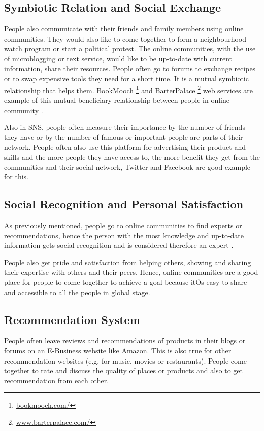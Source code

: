 \subsection{Symbiotic Relation and Social Exchange}

People also communicate with their friends and family members using online communities. They would also like to come together to form a neighbourhood watch program or start a political protest. The online communities, with the use of microblogging or text service, would like to be up-to-date with current information, share their resources. People often go to forums to exchange recipes or to swap expensive tools they need for a short time. It is a mutual symbiotic relationship that helps them. BookMooch \footnote{\url{bookmooch.com/}} and BarterPalace \footnote{\url{www.barterpalace.com/}} web services are example of this mutual beneficiary relationship between people in online community \cite{ridings2004virtual}.

Also in SNS, people often measure their importance by the number of friends they have or by the number of famous or important people are parts of their network. People often also use this platform for advertising their product and skills and the more people they have access to, the more benefit they get from the communities and their social network, Twitter and Facebook are good example for this.

\subsection{Social Recognition and Personal Satisfaction}

As previously mentioned, people go to online communities to find experts or recommendations, hence the person with the most knowledge and up-to-date information gets social recognition and is considered therefore an expert \cite{garton1997studying}.

People also get pride and satisfaction from helping others, showing and sharing their expertise with others and their peers. Hence, online communities are a good  place for people to come together to achieve a goal because itÕs easy to share and accessible to all the people in global stage.


\subsection{Recommendation System}

People often leave reviews and recommendations of products in their blogs or forums on an E-Business website like Amazon. This is also true for other recommendation websites (e.g. for music, movies or restaurants). People come together to rate and discuss the quality of places or products and also to get recommendation from each other.

